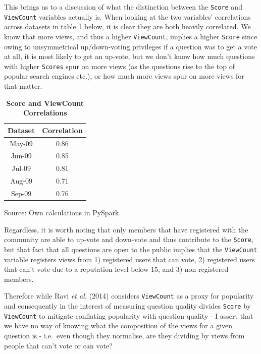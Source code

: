 \documentclass[11pt,preprint, authoryear]{article}
\numberwithin{equation}{section}
\begin{document}
\normalsize

This brings us to a discussion of what the distinction between the
\texttt{Score} and \texttt{ViewCount} variables actually is. When
looking at the two variables' correlations across datasets in table
\ref{tab:corr} below, it is clear they are both heavily correlated. We
know that more views, and thus a higher \texttt{ViewCount}, implies a
higher \texttt{Score} since owing to unsymmetrical up/down-voting
privileges if a question was to get a vote at all, it is most likely to
get an up-vote, but we don't know how much questions with higher
\texttt{Scores} spur on more views (as the questions rise to the top of
popular search engines etc.), or how much more views spur on more views
for that matter.

\footnotesize

\begin{longtable} {@{} cc @{}}
\caption{\textbf{Score and ViewCount Correlations}}
\label{tab:corr}\\ 
\toprule
\textbf{Dataset} & \textbf{Correlation} \\ 
\midrule
May-09 & 0.86 \\
Jun-09 & 0.85 \\
Jul-09 & 0.81 \\
Aug-09 & 0.71 \\
Sep-09 & 0.76 \\
\bottomrule
\end{longtable}\begin{center} Source: Own calculations in PySpark.\end{center}

\normalsize

Regardless, it is worth noting that only members that have registered
with the community are able to up-vote and down-vote and thus contribute
to the \texttt{Score}, but that fact that all questions are open to the
public implies that the \texttt{ViewCount} variable registers views from
1) registered users that can vote, 2) registered users that can't vote
due to a reputation level below 15, and 3) non-registered members.

Therefore while Ravi \emph{et al.} (2014) considers \texttt{ViewCount}
as a proxy for popularity and consequently in the interest of measuring
question quality divides \texttt{Score} by \texttt{ViewCount} to
mitigate conflating popularity with question quality - I assert that we
have no way of knowing what the composition of the views for a given
question is - i.e.~even though they normalise, are they dividing by
views from people that can't vote or can vote?
\end{document}
